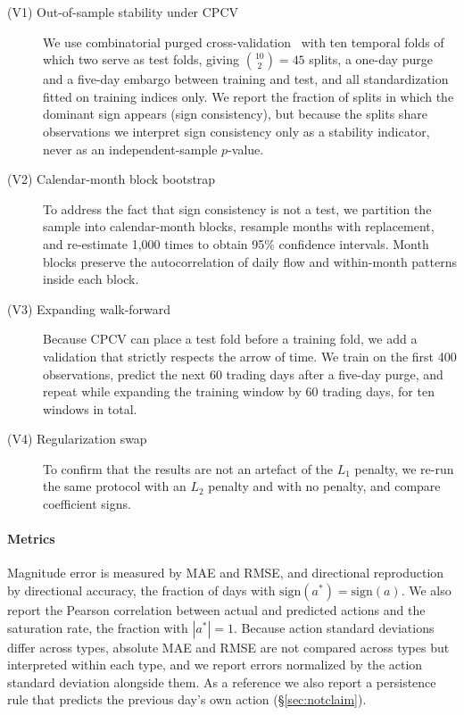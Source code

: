 \begin{description}
\item[(V1) Out-of-sample stability under CPCV] We use combinatorial purged
cross-validation~\cite{lopez2018advances} with ten temporal folds of which two
serve as test folds, giving $\binom{10}{2}=45$ splits, a one-day purge and a
five-day embargo between training and test, and all standardization fitted on
training indices only. We report the fraction of splits in which the dominant
sign appears (sign consistency), but because the splits share observations we
interpret sign consistency only as a stability indicator, never as an
independent-sample $p$-value.

\item[(V2) Calendar-month block bootstrap] To address the fact that sign
consistency is not a test, we partition the sample into calendar-month blocks,
resample months with replacement, and re-estimate 1{,}000 times to obtain 95\%
confidence intervals. Month blocks preserve the autocorrelation of daily flow
and within-month patterns inside each block.

\item[(V3) Expanding walk-forward] Because CPCV can place a test fold before a
training fold, we add a validation that strictly respects the arrow of time. We
train on the first 400 observations, predict the next 60 trading days after a
five-day purge, and repeat while expanding the training window by 60 trading
days, for ten windows in total.

\item[(V4) Regularization swap] To confirm that the results are not an artefact
of the $L_1$ penalty, we re-run the same protocol with an $L_2$ penalty and with
no penalty, and compare coefficient signs.
\end{description}

\paragraph{Metrics}
Magnitude error is measured by MAE and RMSE, and directional reproduction by
directional accuracy, the fraction of days with
$\mathrm{sign}(a^{*})=\mathrm{sign}(a)$. We also report the Pearson correlation
between actual and predicted actions and the saturation rate, the fraction with
$|a^{*}|=1$. Because action standard deviations differ across types, absolute
MAE and RMSE are not compared across types but interpreted within each type, and
we report errors normalized by the action standard deviation alongside them. As
a reference we also report a persistence rule that predicts the previous day's
own action (\S\ref{sec:notclaim}).

